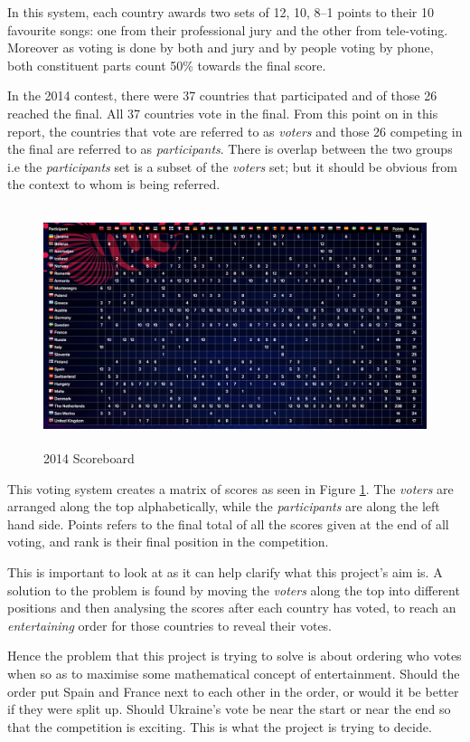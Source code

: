 \documentclass[12pt]{report}
\begin{document}
In this system, each country awards two sets of 12, 10, 8–1 points to their 10 favourite songs: one from their professional jury and the other from tele-voting. Moreover as voting is done by both and jury and by people voting by phone, both constituent parts count 50\% towards the final score.

In the 2014 contest, there were 37 countries that participated and of those 26 reached the final. All 37 countries vote in the final. From this point on in this report, the countries that vote are referred to as \textit{voters} and those 26 competing in the final are referred to as \textit{participants}. There is overlap between the two groups i.e the \textit{participants} set is a subset of the \textit{voters} set; but it should be obvious from the context to whom is being referred.

\begin{figure}[H]
\centering
\includegraphics[width=15cm, height=7cm]{./2014Scoreboard}
\caption{2014 Scoreboard}
\label{f_2014Scores}
\end{figure}

This voting system creates a matrix of scores as seen in Figure \ref{f_2014Scores}. The \textit{voters} are arranged along the top alphabetically, while the \textit{participants} are along the left hand side. Points refers to the final total of all the scores given at the end of all voting, and rank is their final position in the competition. 

This is important to look at as it can help clarify what this project's aim is. A solution to the problem is found by moving the \textit{voters} along the top into different positions and then analysing the scores after each country has voted, to reach an \textit{entertaining} order for those countries to reveal their votes.

Hence the problem that this project is trying to solve is about ordering who votes when so as to maximise some mathematical concept of entertainment. Should the order put Spain and France next to each other in the order, or would it be better if they were split up. Should Ukraine's vote be near the start or near the end so that the competition is exciting. This is what the project is trying to decide.
\end{document}
